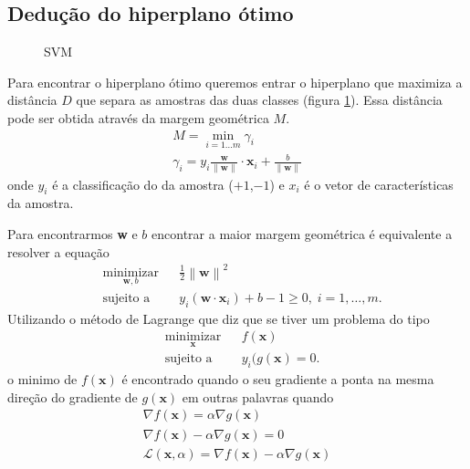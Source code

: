 \subsection{Dedu\c{c}\~ao do hiperplano \'otimo}
\begin{figure}[!htp]
	\begin{center}
		\caption{SVM}
		
		\label{fig:SVM}
	\end{center}	
\end{figure}
Para encontrar o hiperplano \'otimo queremos entrar o hiperplano que maximiza a dist\^ancia $D$ que separa as amostras das duas classes (figura \ref{fig:SVM}). Essa dist\^ancia pode ser obtida atrav\'es da margem geom\'etrica $M$.
\begin{eqnarray}
M = \min_{i=1\dots m} \gamma_i\\
\gamma_i = y_i \frac{\textbf{w}}{\left\| \textbf{w}\right\|} \cdot \textbf{x}_i +{\frac{b}{\left\| \textbf{w} \right\|}}
\end{eqnarray}
onde $y_i$ \'e a classifica\c{c}\~ao do da amostra ($+1$,$-1$) e $x_i$ \'e o vetor de caracter\'isticas da amostra.

Para encontrarmos \textbf{w} e $b$ encontrar a maior margem geom\'etrica \'e equivalente a resolver a equa\c{c}\~ao 
\begin{equation}\label{eq:SVMmin}
\begin{aligned}
& \underset{\textbf{w},b}{\text{minimizar}}
& & \frac{1}{2} {\left\| \textbf{w} \right\|}^{2} \\
& \text{sujeito a}
& & y_i (\textbf{w} \cdot \textbf{x}_i) + b -1 \geq  0, \; i=1,\ldots,m.
\end{aligned}
\end{equation}
Utilizando o m\'etodo de Lagrange que diz que se tiver um problema do tipo
\begin{equation}\label{eq:Lagrange}
\begin{aligned}
& \underset{\textbf{x}}{\text{minimizar}}
& & f\left( \textbf{x} \right)  \\
& \text{sujeito a}
& & y_i (g \left( \textbf{x} \right) = 0.
\end{aligned}
\end{equation}
o minimo de $f\left( \textbf{x} \right)$ \'e encontrado quando o seu gradiente a ponta na mesma dire\c{c}\~ao do gradiente de $g\left( \textbf{x} \right) $ em outras palavras quando
\begin{eqnarray}
\nabla f\left( \textbf{x} \right) = \alpha \nabla g\left( \textbf{x} \right)\\
\nabla f\left( \textbf{x} \right) - \alpha \nabla g\left( \textbf{x} \right)=0\\
\mathcal{L}\left( \textbf{x}, \alpha \right)  = \nabla f\left( \textbf{x} \right) - \alpha \nabla g\left( \textbf{x} \right)
\end{eqnarray}

